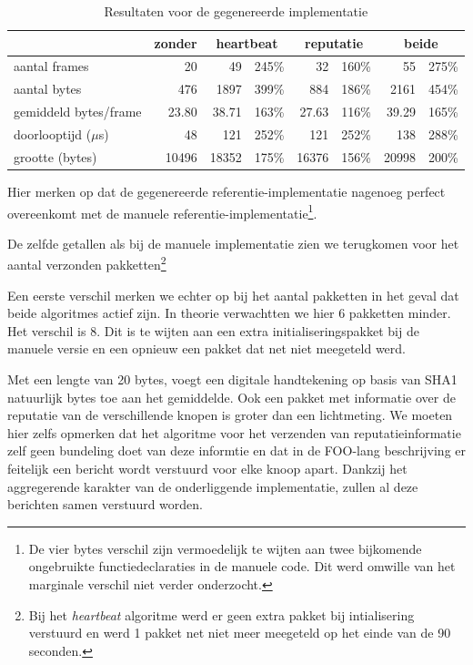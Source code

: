 \begin{table}[H]
  \centering
  \begin{tabular}{l|r|rr|rr|rr}
  \hline
      & zonder & \multicolumn{2}{c|}{heartbeat} & \multicolumn{2}{c|}{reputatie} & \multicolumn{2}{c}{beide} \\
  \hline
  \hline
  
aantal frames	        &    20	   &    49	  & 245\%	&    32	   & 160\% &    55	  & 275\% \\
aantal bytes          &   476	   &  1897	  & 399\%	&   884	   & 186\% &  2161	  & 454\% \\
gemiddeld bytes/frame	&    23.80 &  	38.71	& 163\%	&    27.63 & 116\% &    39.29	& 165\% \\
doorlooptijd ($\mu$s) &    48    &   121	  & 252\%	&   121	   & 252\% &   138	  & 288\% \\
grootte (bytes)       &	10496	   & 18352	  & 175\%	& 16376	   & 156\% & 20998	  & 200\% \\

  \hline
  \end{tabular}
  \caption{Resultaten voor de gegenereerde implementatie}
  \label{tbl:generated}
\end{table}

Hier merken op dat de gegenereerde referentie-implementatie nagenoeg perfect
overeenkomt met de manuele referentie-implementatie\footnote{De vier bytes
verschil zijn vermoedelijk te wijten aan twee bijkomende ongebruikte
functiedeclaraties in de manuele code. Dit werd omwille van het marginale
verschil niet verder onderzocht.}.

De zelfde getallen als bij de manuele implementatie zien we terugkomen voor het
aantal verzonden pakketten\footnote{Bij het \emph{heartbeat} algoritme werd er
geen extra pakket bij intialisering verstuurd en werd 1 pakket net niet meer
meegeteld op het einde van de 90 seconden.}

Een eerste verschil merken we echter op bij het aantal pakketten in het geval
dat beide algoritmes actief zijn. In theorie verwachtten we hier 6 pakketten
minder. Het verschil is 8. Dit is te wijten aan een extra initialiseringspakket
bij de manuele versie en een opnieuw een pakket dat net niet meegeteld werd.

Met een lengte van 20 bytes, voegt een digitale handtekening op basis van SHA1
natuurlijk bytes toe aan het gemiddelde. Ook een pakket met informatie over de
reputatie van de verschillende knopen is groter dan een lichtmeting. We moeten
hier zelfs opmerken dat het algoritme voor het verzenden van
reputatieinformatie zelf geen bundeling doet van deze informtie en dat in de
FOO-lang beschrijving er feitelijk een bericht wordt verstuurd voor elke knoop
apart. Dankzij het aggregerende karakter van de onderliggende implementatie,
zullen al deze berichten samen verstuurd worden.

